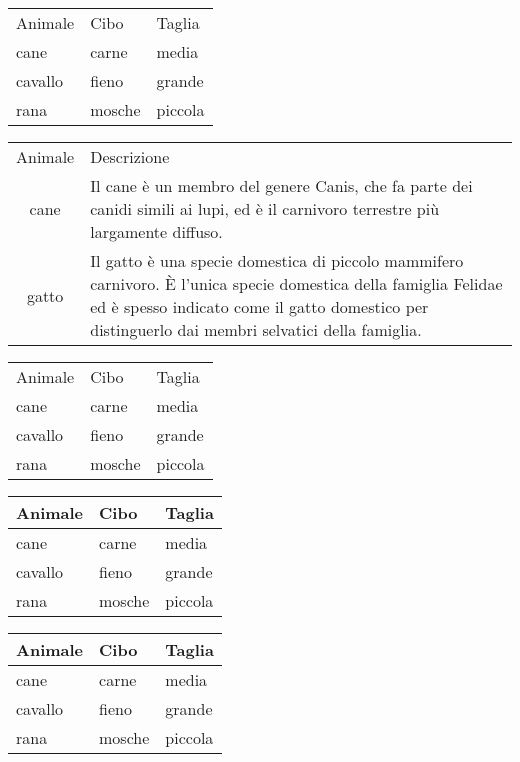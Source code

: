 \documentclass{article}
\begin{document}
\begin{tabular}{lll}
    Animale & Cibo & Taglia \\
    cane    & carne & media \\
    cavallo & fieno & grande \\
    rana    & mosche & piccola \\
\end{tabular}

\bigbreak

\begin{tabular}{cp{9cm}}
    Animale & Descrizione \\
    cane    & Il cane è un membro del genere Canis, che fa parte dei canidi 
               simili ai lupi, ed è il carnivoro terrestre più largamente 
               diffuso. \\  
    gatto   & Il gatto è una specie domestica di piccolo mammifero carnivoro. 
               È l'unica specie domestica della famiglia Felidae ed è spesso 
               indicato come il gatto domestico per distinguerlo dai membri 
               selvatici della famiglia. \\
\end{tabular}

\bigbreak

\begin{tabular}{*{3}{l}}
    Animale & Cibo   & Taglia  \\
    cane    & carne  & media   \\
    cavallo & fieno  & grande  \\
    rana    & mosche & piccola \\
\end{tabular}

\bigbreak

\begin{tabular}{lll}
    \toprule                       %
    Animale & Cibo   & Taglia  \\
    \midrule                       %
    cane    & carne  & media   \\
    cavallo & fieno  & grande  \\
    rana    & mosche & piccola \\
    \bottomrule                    %
\end{tabular}

\bigbreak

\begin{tabular}{lll}
    \toprule
    Animale & Cibo   & Taglia  \\
    \midrule
    cane    & carne  & media   \\
    \cmidrule{1-2}                 %
    cavallo & fieno  & grande  \\  
    \cmidrule{1-1}                 %
    \cmidrule{3-3}                 %
    rana    & mosche & piccola \\
    \bottomrule
\end{tabular}
\end{document}
